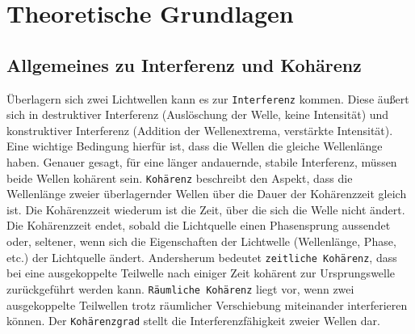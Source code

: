 \section{Theoretische Grundlagen}
\subsection{Allgemeines zu Interferenz und Kohärenz}
Überlagern sich zwei Lichtwellen kann es zur \texttt{Interferenz} kommen.
Diese äußert sich in destruktiver Interferenz (Auslöschung der Welle, keine Intensität) und konstruktiver Interferenz (Addition der Wellenextrema, verstärkte Intensität).
Eine wichtige Bedingung hierfür ist, dass die Wellen die gleiche Wellenlänge haben.
Genauer gesagt, für eine länger andauernde, stabile Interferenz, müssen beide Wellen kohärent sein.
\texttt{Kohärenz} beschreibt den Aspekt, dass die Wellenlänge zweier überlagernder Wellen über die Dauer der Kohärenzzeit gleich ist.
Die Kohärenzzeit wiederum ist die Zeit, über die sich die Welle nicht ändert.
Die Kohärenzzeit endet, sobald die Lichtquelle einen Phasensprung aussendet oder, seltener, wenn sich die Eigenschaften der Lichtwelle (Wellenlänge, Phase, etc.) der Lichtquelle ändert.
Andersherum bedeutet \texttt{zeitliche Kohärenz}, dass bei eine ausgekoppelte Teilwelle nach einiger Zeit kohärent zur Ursprungswelle zurückgeführt werden kann.
\texttt{Räumliche Kohärenz} liegt vor, wenn zwei ausgekoppelte Teilwellen trotz räumlicher Verschiebung miteinander interferieren können.
Der \texttt{Kohärenzgrad} stellt die Interferenzfähigkeit zweier Wellen dar.

\FloatBarrier
